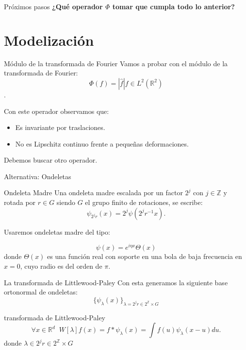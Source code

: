 \documentclass[aspectratio=43]{beamer}
\begin{document}
  \begin{frame}{Próximos pasos}
    \centering \textcolor{tudCyan}{\textbf{¿Qué operador $\Phi$ tomar que cumpla todo lo anterior?}}
  \end{frame}

\section{Modelización}

\begin{frame}{Módulo de la transformada de Fourier}
  \textcolor{tudCyan}{Vamos a probar con el módulo de la transformada de Fourier:}
  $$\Phi(f)=|\widehat{f}| f\in L^2(\mathbb{R}^2)$$.

  Con este operador observamos que: 
  \begin{itemize}
    \item Es invariante por traslaciones.
    \item No es Lipschitz continuo frente a pequeñas deformaciones.
  \end{itemize}

  Debemos buscar otro operador.
\end{frame}

\begin{frame}{Alternativa: Ondeletas}
  
  \begin{block}{Ondeleta Madre}
    Una ondeleta madre escalada por un factor $2^{j}$ con $j \in \mathbb{Z}$ y rotada por $r \in G$ siendo $G$ el grupo finito de rotaciones, se escribe: 
    $$\psi_{2^j r}(x)=2^{j} \psi(2^j r^{-1} x).$$
  \end{block}

  Usaremos ondeletas madre del tipo: 

  \begin{equation}
    \psi(x)=e^{i\eta x} \Theta(x)
  \end{equation}
  donde $\Theta(x)$ es una función real con soporte en una bola de baja frecuencia en $x=0$, cuyo radio es del orden de $\pi$.
\end{frame}

\begin{frame}{La transformada de Littlewood-Paley}
  Con esta generamos la siguiente base ortonormal de ondeletas: 
  \begin{equation}
    \lbrace \psi_\lambda (x) \rbrace_{\lambda= 2^j r \in 2^\mathbb{Z} \times G}
  \end{equation}

  \begin{block}{transformada de Littlewood-Paley}
    \begin{equation}
      \forall x \in  \mathbb{R}^d \;\; W[\lambda]f(x)= f \ast \psi_\lambda(x)=\int f(u)\psi_\lambda(x-u) du .
    \end{equation}
    donde $\lambda \in 2^j r \in 2^\mathbb{Z} \times G$
  \end{block}
\end{frame}
\end{document}
